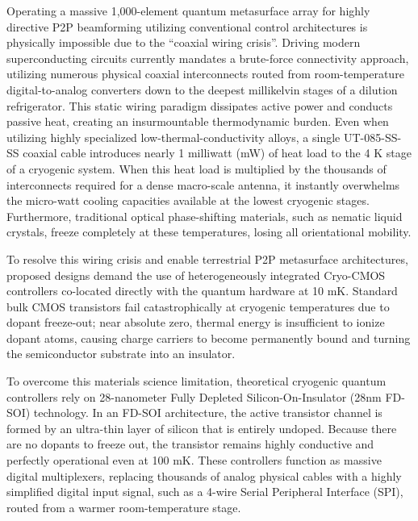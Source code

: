 \documentclass[11pt,a4paper]{article}
\begin{document}
Operating a massive 1,000-element quantum metasurface array for highly directive P2P beamforming utilizing conventional control architectures is physically impossible due to the ``coaxial wiring crisis''.\cite{ref6} Driving modern superconducting circuits currently mandates a brute-force connectivity approach, utilizing numerous physical coaxial interconnects routed from room-temperature digital-to-analog converters down to the deepest millikelvin stages of a dilution refrigerator.\cite{ref6} This static wiring paradigm dissipates active power and conducts passive heat, creating an insurmountable thermodynamic burden.\cite{ref6} Even when utilizing highly specialized low-thermal-conductivity alloys, a single UT-085-SS-SS coaxial cable introduces nearly 1 milliwatt (mW) of heat load to the 4 K stage of a cryogenic system.\cite{ref6} When this heat load is multiplied by the thousands of interconnects required for a dense macro-scale antenna, it instantly overwhelms the micro-watt cooling capacities available at the lowest cryogenic stages.\cite{ref6} Furthermore, traditional optical phase-shifting materials, such as nematic liquid crystals, freeze completely at these temperatures, losing all orientational mobility.\cite{ref6}

To resolve this wiring crisis and enable terrestrial P2P metasurface architectures, proposed designs demand the use of heterogeneously integrated Cryo-CMOS controllers co-located directly with the quantum hardware at 10 mK.\cite{ref6} Standard bulk CMOS transistors fail catastrophically at cryogenic temperatures due to dopant freeze-out; near absolute zero, thermal energy is insufficient to ionize dopant atoms, causing charge carriers to become permanently bound and turning the semiconductor substrate into an insulator.\cite{ref6}

To overcome this materials science limitation, theoretical cryogenic quantum controllers rely on 28-nanometer Fully Depleted Silicon-On-Insulator (28nm FD-SOI) technology.\cite{ref6} In an FD-SOI architecture, the active transistor channel is formed by an ultra-thin layer of silicon that is entirely undoped.\cite{ref6} Because there are no dopants to freeze out, the transistor remains highly conductive and perfectly operational even at 100 mK.\cite{ref6} These controllers function as massive digital multiplexers, replacing thousands of analog physical cables with a highly simplified digital input signal, such as a 4-wire Serial Peripheral Interface (SPI), routed from a warmer room-temperature stage.\cite{ref6}
\end{document}
